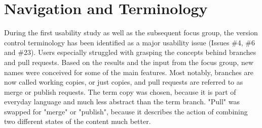 
\section{Navigation and Terminology} \label{sec:navigation-revised-terminology}
During the first usability study as well as the subsequent focus group, the version control terminology has been identified as a major usability issue (Issues \#4, \#6 and \#23). Users especially struggled with grasping the concepts behind branches and pull requests. Based on the results and the input from the focus group, new names were conceived for some of the main features. Most notably, branches are now called working copies, or just copies, and pull requests are referred to as merge or publish requests. The term copy was chosen, because it is part of everyday language and much less abstract than the term branch. "Pull" was swapped for "merge" or "publish", because it describes the action of combining two different states of the content much better.

